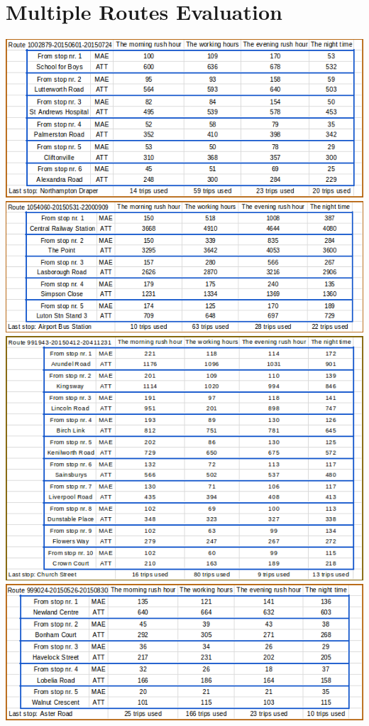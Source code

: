 \documentclass[12pt,a4paper,oneside,openright]{report}
\begin{document}
\section{Multiple Routes Evaluation}

\label{B1}

\includegraphics[width=\textwidth]{figs/table_of_1002879.png}
\includegraphics[width=\textwidth]{figs/table_of_1054060.png}
\includegraphics[width=\textwidth]{figs/table_of_991943.png}
\includegraphics[width=\textwidth]{figs/table_of_999024.png}
\end{document}
